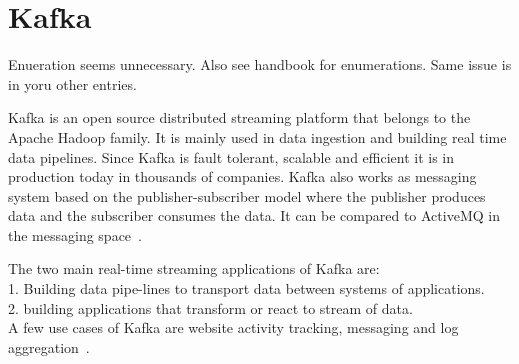 \section{Kafka}

\begin{NOTE}
Enueration seems unnecessary. Also see handbook for enumerations. Same
issue is in yoru other entries.
\end{NOTE}

Kafka is an open source distributed streaming platform that belongs 
to the Apache Hadoop family. It is mainly used in data ingestion and 
building real time data pipelines. Since Kafka is fault tolerant, 
scalable and efficient it is in production today in thousands of 
companies. Kafka also works as messaging system based on the 
publisher-subscriber model where the publisher produces data and 
the subscriber consumes the data. It can be compared to ActiveMQ 
in the messaging space~\cite{hid-sp18-517-ApacheKafka}.


The two main real-time streaming applications of Kafka are: \\
1. Building data pipe-lines to transport data between systems of 
   applications.\\
2. building applications that transform or react to stream of data. \\

A few use cases of Kafka are website activity tracking, messaging 
and log aggregation~\cite{hid-sp18-517-ApacheKafka}.


